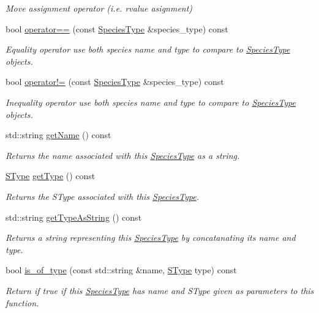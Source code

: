 \begin{DoxyCompactItemize}
\begin{DoxyCompactList}\small\item\em Move assignment operator (i.\-e. rvalue asignment) \end{DoxyCompactList}\item 
bool \hyperlink{classchem_1_1SpeciesType_a26cd9f021f86747f960486153cf12531}{operator==} (const \hyperlink{classchem_1_1SpeciesType}{Species\-Type} \&species\-\_\-type) const 
\begin{DoxyCompactList}\small\item\em Equality operator use both species name and type to compare to \hyperlink{classchem_1_1SpeciesType}{Species\-Type} objects. \end{DoxyCompactList}\item 
bool \hyperlink{classchem_1_1SpeciesType_a9ed717ed9efe75c589e1cbb8e0c6cec2}{operator!=} (const \hyperlink{classchem_1_1SpeciesType}{Species\-Type} \&species\-\_\-type) const 
\begin{DoxyCompactList}\small\item\em Inequality operator use both species name and type to compare to \hyperlink{classchem_1_1SpeciesType}{Species\-Type} objects. \end{DoxyCompactList}\item 
std\-::string \hyperlink{classchem_1_1SpeciesType_a46d08ce3d52467ca2f1900015cba5518}{get\-Name} () const 
\begin{DoxyCompactList}\small\item\em Returns the name associated with this \hyperlink{classchem_1_1SpeciesType}{Species\-Type} as a string. \end{DoxyCompactList}\item 
\hyperlink{namespacechem_ad1edc1332f82ed64dd8a810596e781da}{S\-Type} \hyperlink{classchem_1_1SpeciesType_a35689373892bc8f87c2e36692f2b9aaf}{get\-Type} () const 
\begin{DoxyCompactList}\small\item\em Returns the S\-Type associated with this \hyperlink{classchem_1_1SpeciesType}{Species\-Type}. \end{DoxyCompactList}\item 
std\-::string \hyperlink{classchem_1_1SpeciesType_a827ec7bb7476c9c475ba4f14d7be16c5}{get\-Type\-As\-String} () const 
\begin{DoxyCompactList}\small\item\em Returns a string representing this \hyperlink{classchem_1_1SpeciesType}{Species\-Type} by concatanating its name and type. \end{DoxyCompactList}\item 
bool \hyperlink{classchem_1_1SpeciesType_a83fb00e3a5fc394eb12a2dcb06ff8ce0}{is\-\_\-of\-\_\-type} (const std\-::string \&name, \hyperlink{namespacechem_ad1edc1332f82ed64dd8a810596e781da}{S\-Type} type) const 
\begin{DoxyCompactList}\small\item\em Return if true if this \hyperlink{classchem_1_1SpeciesType}{Species\-Type} has name and S\-Type given as parameters to this function. \end{DoxyCompactList}\end{DoxyCompactItemize}
